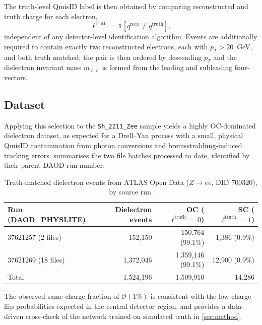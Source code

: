 The truth-level QmisID label is then obtained by comparing reconstructed and truth charge for each electron,
\[
\ell^{\mathrm{truth}} = \mathbb{1}\!\left[q^{\mathrm{reco}} \neq q^{\mathrm{truth}}\right],
\]
independent of any detector-level identification algorithm. Events are additionally required to contain exactly two reconstructed electrons, each with \(p_T > 20\)~GeV, and both truth matched; the pair is then ordered by descending \(p_T\) and the dielectron invariant mass \(m_{\ell\ell}\) is formed from the leading and subleading four-vectors.

\subsection{Dataset}

Applying this selection to the \texttt{Sh\_2211\_Zee} sample yields a highly OC-dominated dielectron dataset, as expected for a Drell--Yan process with a small, physical QmisID contamination from photon conversions and bremsstrahlung-induced tracking errors.  summarises the two file batches processed to date, identified by their parent DAOD run number.

\begin{table}[H]
\centering
\begin{tabular}{lrrr}
\toprule
Run (DAOD\_PHYSLITE) & Dielectron events & OC (\(\ell^{\mathrm{truth}}=0\)) & SC (\(\ell^{\mathrm{truth}}=1\)) \\
\midrule
37621257 (2 files)  & 152{,}150   & 150{,}764 (99.1\%) & 1{,}386 (0.9\%)  \\
37621269 (18 files) & 1{,}372{,}046 & 1{,}359{,}146 (99.1\%) & 12{,}900 (0.9\%) \\
\midrule
Total & 1{,}524{,}196 & 1{,}509{,}910 & 14{,}286 \\
\bottomrule
\end{tabular}
\caption{Truth-matched dielectron events from ATLAS Open Data (\(Z\rightarrow ee\), DID 700320), by source run.}
\label{tab:opendata}
\end{table}

The observed same-charge fraction of \(\mathcal{O}(1\%)\) is consistent with the low charge-flip probabilities expected in the central detector region, and provides a data-driven cross-check of the network trained on simulated truth in \cref{sec:method}.
